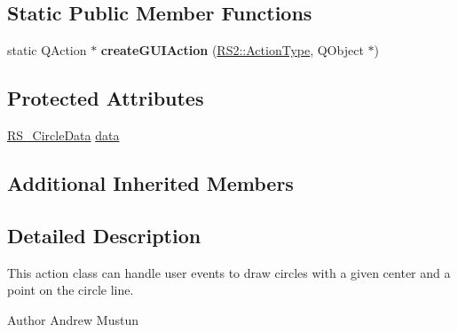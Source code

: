 \subsection*{Static Public Member Functions}
\begin{DoxyCompactItemize}
\item 
\hypertarget{classRS__ActionDrawCircle_a0a3cbd760ed40485c876365db1c87003}{static Q\-Action $\ast$ {\bfseries create\-G\-U\-I\-Action} (\hyperlink{classRS2_afe3523e0bc41fd637b892321cfc4b9d7}{R\-S2\-::\-Action\-Type}, Q\-Object $\ast$)}\label{classRS__ActionDrawCircle_a0a3cbd760ed40485c876365db1c87003}

\end{DoxyCompactItemize}
\subsection*{Protected Attributes}
\begin{DoxyCompactItemize}
\item 
\hyperlink{classRS__CircleData}{R\-S\-\_\-\-Circle\-Data} \hyperlink{classRS__ActionDrawCircle_aef8a2eaa480822c8646f2eef0af40c3d}{data}
\end{DoxyCompactItemize}
\subsection*{Additional Inherited Members}


\subsection{Detailed Description}
This action class can handle user events to draw circles with a given center and a point on the circle line.

\begin{DoxyAuthor}{Author}
Andrew Mustun 
\end{DoxyAuthor}


